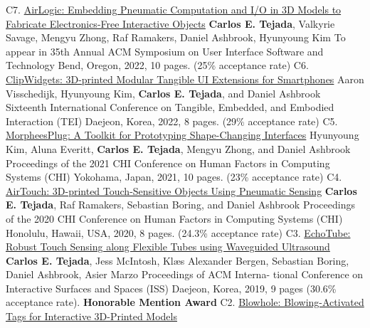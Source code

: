 


    \begin{cvpublications}
      \cvpublication%
        {C7.}%
        {\href{https://doi.org/10.1145/3526113.3545642}{AirLogic: Embedding Pneumatic Computation and I/O in 3D Models to Fabricate Electronics-Free Interactive Objects}}%
        {\textbf{Carlos E. Tejada}, Valkyrie Savage, Mengyu Zhong, Raf Ramakers, Daniel Ashbrook, Hyunyoung Kim}
        {To appear in 35th Annual ACM Symposium on User Interface Software and Technology}
        {Bend, Oregon, 2022, 10 pages. (25\% acceptance rate)}
      \cvpublication%
        {C6.}%
        {\href{https://doi.org/10.1145/3490149.3501314}{ClipWidgets: 3D-printed Modular Tangible UI Extensions for Smartphones}}%
        {Aaron Visschedijk, Hyunyoung Kim, \textbf{Carlos E. Tejada}, and Daniel Ashbrook}%
        {Sixteenth International Conference on Tangible, Embedded, and Embodied Interaction (TEI)}
        {Daejeon, Korea, 2022, 8 pages. (29\% acceptance rate)}
      \cvpublication%
        {C5.}%
        {\href{https://doi.org/10.1145/3313831.3376136}{MorpheesPlug: A Toolkit for Prototyping Shape-Changing Interfaces}}%
        {Hyunyoung Kim, Aluna Everitt, \textbf{Carlos E. Tejada}, Mengyu Zhong, and Daniel Ashbrook}%
        {Proceedings of the 2021 CHI Conference on Human Factors in Computing Systems (CHI)}%
        {Yokohama, Japan, 2021, 10 pages. (23\% acceptance rate)}
      \cvpublication%
        {C4.}%
        {\href{https://doi.org/10.1145/3313831.3376136}{AirTouch: 3D-printed Touch-Sensitive Objects Using Pneumatic Sensing}}%
        {\textbf{Carlos E. Tejada}, Raf Ramakers, Sebastian Boring, and Daniel Ashbrook}%
        {Proceedings of the 2020 CHI Conference on Human Factors in Computing Systems (CHI)}%
        {Honolulu, Hawaii, USA, 2020, 8 pages. (24.3\% acceptance rate)}
      \cvpublication%
        {C3.}
        {\href{https://doi.org/10.1145/3343055.3359712}{EchoTube: Robust Touch Sensing along Flexible Tubes using Waveguided Ultrasound}}%
        {\textbf{Carlos E. Tejada}, Jess McIntosh, Klæs Alexander Bergen, Sebastian Boring, Daniel Ashbrook, Asier Marzo}%
        {Proceedings of ACM Interna- tional Conference on Interactive Surfaces and Spaces (ISS)}%
        {Daejeon, Korea, 2019, 9 pages (30.6\% acceptance rate). \bf Honorable Mention Award}
      \cvpublication%
        {C2.}%
        {\href{https://doi.org/10.20380/GI2018.18}{Blowhole: Blowing-Activated Tags for Interactive 3D-Printed Models}}%

\end{cvpublications}
